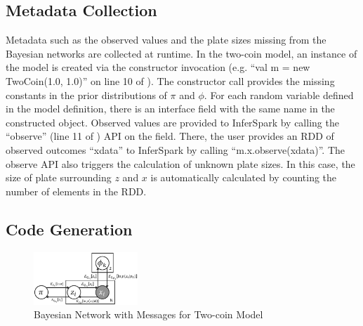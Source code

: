 
\subsection{Metadata Collection}

Metadata such as the observed values and the plate sizes missing from the
Bayesian networks are collected at runtime. In the two-coin
model, an instance of the model is created via the constructor invocation (e.g.
``{\sf val m = new TwoCoin(1.0, 1.0)}'' on line 10 of ). The constructor call provides
the missing constants in the prior distributions of $\pi$ and $\phi$. 
For each random variable defined in the model definition, 
there is an interface field with the
same name in the constructed object. Observed values are provided to InferSpark
by calling the ``{\sf observe}'' (line 11 of ) 
API on the field. 
There, the user provides an RDD of observed outcomes ``{\sf xdata}'' to InferSpark by calling
``{\sf m.x.observe(xdata)}''. The  {\sf observe} API also triggers 
the calculation of unknown plate sizes. 
In this case, the size of plate surrounding $z$ and $x$ is
automatically calculated by counting the number of elements in the RDD.


\subsection{Code Generation}

\begin{figure}
\centering
	\includegraphics[width=0.35\textwidth]{figs/two_coins_msg.eps}
	\caption{Bayesian Network with Messages for Two-coin Model}
	\label{fig:two_coins_msg}
\end{figure}

